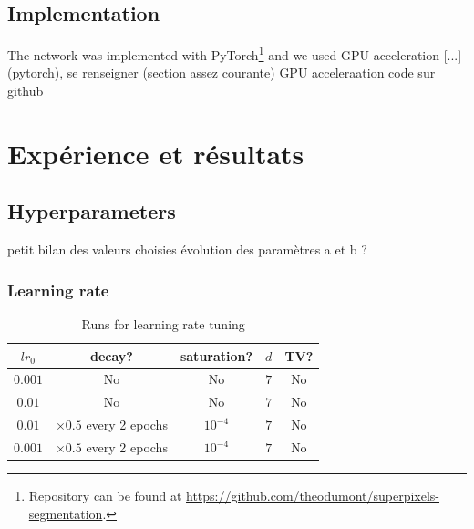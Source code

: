 \documentclass{article}
\begin{document}
    \subsection{Implementation}
    The network was implemented with PyTorch\footnote{Repository can be found at \url{https://github.com/theodumont/superpixels-segmentation}.} and we used GPU acceleration [...]
    (pytorch), se renseigner (section assez courante)
    GPU acceleraation
    code sur github









\section{Expérience et résultats}
    \subsection{Hyperparameters}
    petit bilan des valeurs choisies
    évolution des paramètres a et b ?\\
        \subsubsection{Learning rate}
        \begin{table}[!ht]
            \center
            \begin{tabular}{|c|c|c|c|c|}
                \hline
                $lr_0$ & decay? & saturation? & $d$ & TV? \\
                \hline \hline
                $0.001$ & No & No & $7$ & No \\
                \hline
                $0.01$ & No & No & $7$ & No \\
                \hline
                $0.01$ & $\times 0.5$ every 2 epochs & $10^{-4}$ & $7$ & No \\
                \hline
                $0.001$ & $\times 0.5$ every 2 epochs & $10^{-4}$ & $7$ & No \\
                \hline
            \end{tabular}
        \caption{Runs for learning rate tuning}
        \end{table}
\end{document}
